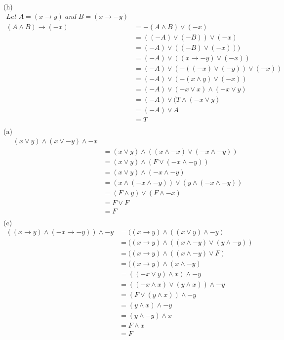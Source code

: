 \documentclass[12pt]{article}
\begin{document}
\vspace{.15in}
(h)
\[
\begin{aligned}
Let\; A=(x \to y) \;and\; B=(x \to -y)\\
(A \wedge B) \to (-x)
&=-(A \wedge B) \vee (-x)\\
&=((-A) \vee (-B)) \vee(-x)\\
&=(-A) \vee ((-B) \vee (-x)))\\
&=(-A) \vee ((x \to -y) \vee (-x))\\
&=(-A) \vee (-((-x) \vee (-y)) \vee (-x))\\
&=(-A) \vee (-(x \wedge y) \vee (-x)) \\
&=(-A) \vee (-x \vee x) \wedge (-x \vee y)\\
&=(-A) \vee (T \wedge (-x \vee y)\\
&=(-A) \vee A\\
&=T \\
\end{aligned}
\]
\vspace{.15in}
(a)
\[
\begin{aligned}
(x \vee y) \wedge (x \vee -y) \wedge -x\\
&=(x \vee y)\wedge( (x \wedge -x) \vee (-x \wedge -y))\\
&=(x \vee y)\wedge (F \vee (-x \wedge -y))\\
&=(x \vee y)\wedge (-x \wedge -y)\\
&=(x \wedge (-x \wedge -y)) \vee (y \wedge (-x \wedge -y))\\
&=(F\wedge y) \vee (F \wedge -x)\\
&=F \vee F\\
&=F  \\
\end{aligned}
\]
\vspace{.15in}
(c)
\[
\begin{aligned}
((x \to y) \wedge (-x \to -y)) \wedge -y
&=((x \to y) \wedge ((x \vee y) \wedge -y)\\
&=((x \to y) \wedge ((x \wedge -y) \vee (y\wedge -y))\\
&=((x \to y) \wedge ((x \wedge -y) \vee F)\\
&=((x \to y) \wedge (x \wedge -y)\\
&=((-x \vee y)\wedge x) \wedge -y\\
&=((-x \wedge x) \vee (y \wedge x)) \wedge -y\\
&=(F \vee (y \wedge x))\wedge -y\\
&=(y \wedge x) \wedge -y\\
&= (y \wedge -y) \wedge x\\
&= F \wedge x\\
&= F  \\
\end{aligned}
\]
\end{document}
